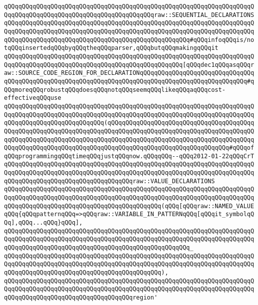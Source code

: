 \verb|qQQqqQQqqQQqqQQqqQQqqQQqqQQqqQQqqQQqqQQqqQQqqQQqqQQqqQQqqQQqqQQqqQQqqQQqqQQqqQQqqQQqqQQqqQQqqQQqqQQqqQQqqQQqqQQqraw::SEQUENTIAL_DECLARATIONSqQQqqQQqqQQqqQQqqQQqqQQqqQQqqQQqqQQqqQQqqQQqqQQqqQQqqQQqqQQqqQQqqQQqqQQqqQQqqQQqqQQqqQQqqQQqqQQqqQQqqQQqqQQqqQQqqQQqqQQqqQQqqQQqqQQqqQQqqQQqqQQqqQQqqQQqqQQqqQQqqQQqqQQqqQQqqQQqqQQqqQQqqQQqqQQq#qQQqinfoqQQqis/notqQQqinsertedqQQqbyqQQqtheqQQqparser,qQQqbutqQQqmakingqQQqit|\newline
\verb|qQQqqQQqqQQqqQQqqQQqqQQqqQQqqQQqqQQqqQQqqQQqqQQqqQQqqQQqqQQqqQQqqQQqqQQqqQQqqQQqqQQqqQQqqQQqqQQqqQQqqQQqqQQqqQQqqQQqqQQq[qQQqdec1qQQqasqQQqraw::SOURCE_CODE_REGION_FOR_DECLARATIONqQQqqQQqqQQqqQQqqQQqqQQqqQQqqQQqqQQqqQQqqQQqqQQqqQQqqQQqqQQqqQQqqQQqqQQqqQQqqQQqqQQqqQQqqQQqqQQqqQQq#qQQqmoreqQQqrobustqQQqdoesqQQqnotqQQqseemqQQqlikeqQQqaqQQqcost-effectiveqQQquse|\newline
\verb|qQQqqQQqqQQqqQQqqQQqqQQqqQQqqQQqqQQqqQQqqQQqqQQqqQQqqQQqqQQqqQQqqQQqqQQqqQQqqQQqqQQqqQQqqQQqqQQqqQQqqQQqqQQqqQQqqQQqqQQqqQQqqQQqqQQqqQQqqQQqqQQqqQQqqQQqqQQqqQQqqQQqqQQq(qQQqqQQqqQQqqQQqqQQqqQQqqQQqqQQqqQQqqQQqqQQqqQQqqQQqqQQqqQQqqQQqqQQqqQQqqQQqqQQqqQQqqQQqqQQqqQQqqQQqqQQqqQQqqQQqqQQqqQQqqQQqqQQqqQQqqQQqqQQqqQQqqQQqqQQqqQQqqQQqqQQqqQQqqQQqqQQqqQQqqQQqqQQqqQQqqQQqqQQqqQQqqQQqqQQqqQQqqQQqqQQqqQQqqQQqqQQqqQQqqQQq#qQQqofqQQqprogrammingqQQqtimeqQQqjustqQQqnow.qQQqqQQq--qQQq2012-01-22qQQqCrT|\newline
\verb|qQQqqQQqqQQqqQQqqQQqqQQqqQQqqQQqqQQqqQQqqQQqqQQqqQQqqQQqqQQqqQQqqQQqqQQqqQQqqQQqqQQqqQQqqQQqqQQqqQQqqQQqqQQqqQQqqQQqqQQqqQQqqQQqqQQqqQQqqQQqqQQqqQQqqQQqqQQqqQQqqQQqqQQqqQQqqQQqraw::VALUE_DECLARATIONS|\newline
\verb|qQQqqQQqqQQqqQQqqQQqqQQqqQQqqQQqqQQqqQQqqQQqqQQqqQQqqQQqqQQqqQQqqQQqqQQqqQQqqQQqqQQqqQQqqQQqqQQqqQQqqQQqqQQqqQQqqQQqqQQqqQQqqQQqqQQqqQQqqQQqqQQqqQQqqQQqqQQqqQQqqQQqqQQqqQQqqQQqqQQqqQQq(qQQq[qQQqraw::NAMED_VALUEqQQq{qQQqpatternqQQq=>qQQqraw::VARIABLE_IN_PATTERNqQQq[qQQqit_symbolqQQq],qQQq...qQQq}qQQq],|\newline
\verb|qQQqqQQqqQQqqQQqqQQqqQQqqQQqqQQqqQQqqQQqqQQqqQQqqQQqqQQqqQQqqQQqqQQqqQQqqQQqqQQqqQQqqQQqqQQqqQQqqQQqqQQqqQQqqQQqqQQqqQQqqQQqqQQqqQQqqQQqqQQqqQQqqQQqqQQqqQQqqQQqqQQqqQQqqQQqqQQqqQQqqQQqqQQqqQQq_|\newline
\verb|qQQqqQQqqQQqqQQqqQQqqQQqqQQqqQQqqQQqqQQqqQQqqQQqqQQqqQQqqQQqqQQqqQQqqQQqqQQqqQQqqQQqqQQqqQQqqQQqqQQqqQQqqQQqqQQqqQQqqQQqqQQqqQQqqQQqqQQqqQQqqQQqqQQqqQQqqQQqqQQqqQQqqQQqqQQqqQQqqQQqqQQq),|\newline
\verb|qQQqqQQqqQQqqQQqqQQqqQQqqQQqqQQqqQQqqQQqqQQqqQQqqQQqqQQqqQQqqQQqqQQqqQQqqQQqqQQqqQQqqQQqqQQqqQQqqQQqqQQqqQQqqQQqqQQqqQQqqQQqqQQqqQQqqQQqqQQqqQQqqQQqqQQqqQQqqQQqqQQqqQQqqQQqqQQqregion'|\newline
